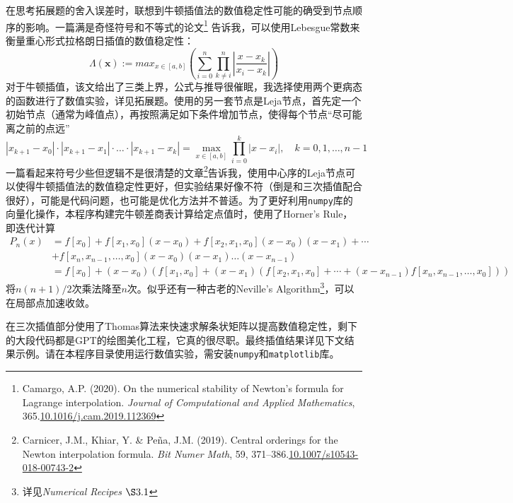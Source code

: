 在思考拓展题的舍入误差时，联想到牛顿插值法的数值稳定性可能的确受到节点顺序的影响。一篇满是奇怪符号和不等式的论文\footnote{Camargo, A.P. (2020). On the numerical stability of Newton’s formula for Lagrange interpolation. \textit{Journal of Computational and Applied Mathematics}, 365.\href{https://doi.org/10.1016/j.cam.2019.112369}{10.1016/j.cam.2019.112369}}
告诉我，可以使用Lebesgue常数来衡量重心形式拉格朗日插值的数值稳定性：
\[
\Lambda\left(\mathbf{x}\right):=max_{x\in\left[a,b\right]}\left(\sum_{i=0}^n\prod_{k\neq i}^n\left|\frac{x-x_k}{x_i-x_k}\right|\right)
\]
对于牛顿插值，该文给出了三类上界，公式与推导很催眠，我选择使用两个更病态的函数进行了数值实验，详见拓展题。使用的另一套节点是Leja节点，首先定一个初始节点（通常为峰值点），再按照满足如下条件增加节点，使得每个节点“尽可能离之前的点远”
\[
|x_{k+1} - x_0| \cdot |x_{k+1} - x_1| \cdot \dots \cdot |x_{k+1} - x_k| = \max_{x \in [a,b]} \prod_{i=0}^{k} |x - x_i|, \quad k = 0, 1, \dots, n-1
\]
一篇看起来符号少些但逻辑不是很清楚的文章\footnote{Carnicer, J.M., Khiar, Y. \& Peña, J.M. (2019). Central orderings for the Newton interpolation formula. \textit{Bit Numer Math}, 59, 371–386.\href{https://doi.org/10.1007/s10543-018-00743-2}{10.1007/s10543-018-00743-2}}告诉我，使用中心序的Leja节点可以使得牛顿插值法的数值稳定性更好，但实验结果好像不符（倒是和三次插值配合很好），可能是代码问题，也可能是优化方法并不普适。为了更好利用\texttt{numpy}库的向量化操作，本程序构建完牛顿差商表计算给定点值时，使用了Horner's Rule，即迭代计算
\[
\begin{aligned}
P_n(x) &= f[x_0] + f[x_1, x_0](x - x_0) + f[x_2, x_1, x_0](x - x_0)(x - x_1) + \cdots\\
&+ f[x_n, x_{n-1}, \dots, x_0](x - x_0)(x - x_1)\dots(x - x_{n-1}) \\
&= f[x_0] + (x - x_0) \left( f[x_1, x_0] + (x - x_1) \left( f[x_2, x_1, x_0] + \cdots + (x - x_{n-1}) f[x_n, x_{n-1}, \dots, x_0] \right) \right)
\end{aligned}\label{eq:horner}
\]
将$n(n+1)/2$次乘法降至$n$次。似乎还有一种古老的Neville's Algorithm\footnote{详见\textit{Numerical Recipes $\S 3.1$}}，可以在局部点加速收敛。

在三次插值部分使用了Thomas算法来快速求解条状矩阵以提高数值稳定性，剩下的大段代码都是GPT的绘图美化工程，它真的很尽职。最终插值结果详见下文结果示例。请在本程序目录使用运行数值实验，需安装\texttt{numpy}和\texttt{matplotlib}库。

